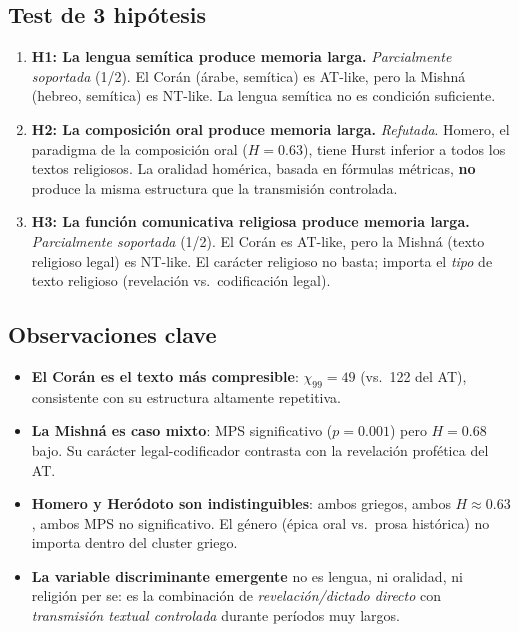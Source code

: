 \documentclass[12pt,a4paper]{article}
\begin{document}
\subsection{Test de 3 hip\'otesis}

\begin{enumerate}[leftmargin=2em]
\item \textbf{H1: La lengua sem\'itica produce memoria larga.}
      \emph{Parcialmente soportada} (1/2). El Cor\'an (\'arabe, sem\'itica) es AT-like,
      pero la Mishn\'a (hebreo, sem\'itica) es NT-like. La lengua sem\'itica no es
      condici\'on suficiente.

\item \textbf{H2: La composici\'on oral produce memoria larga.}
      \emph{Refutada}. Homero, el paradigma de la composici\'on oral ($H = 0.63$),
      tiene Hurst inferior a todos los textos religiosos. La oralidad hom\'erica,
      basada en f\'ormulas m\'etricas, \textbf{no} produce la misma estructura que la
      transmisi\'on controlada.

\item \textbf{H3: La funci\'on comunicativa religiosa produce memoria larga.}
      \emph{Parcialmente soportada} (1/2). El Cor\'an es AT-like, pero la Mishn\'a
      (texto religioso legal) es NT-like. El car\'acter religioso no basta;
      importa el \emph{tipo} de texto religioso (revelaci\'on vs.\ codificaci\'on legal).
\end{enumerate}

\subsection{Observaciones clave}

\begin{itemize}[leftmargin=2em]
\item \textbf{El Cor\'an es el texto m\'as compresible}: $\chi_{99} = 49$
      (vs.\ 122 del AT), consistente con su estructura altamente repetitiva.
\item \textbf{La Mishn\'a es caso mixto}: MPS significativo ($p = 0.001$)
      pero $H = 0.68$ bajo. Su car\'acter legal-codificador contrasta
      con la revelaci\'on prof\'etica del AT.
\item \textbf{Homero y Her\'odoto son indistinguibles}: ambos griegos,
      ambos $H \approx 0.63$, ambos MPS no significativo. El g\'enero
      (\'epica oral vs.\ prosa hist\'orica) no importa dentro del cluster griego.
\item \textbf{La variable discriminante emergente} no es lengua, ni oralidad,
      ni religi\'on per se: es la combinaci\'on de \emph{revelaci\'on/dictado directo}
      con \emph{transmisi\'on textual controlada} durante per\'iodos muy largos.
\end{itemize}
\end{document}
